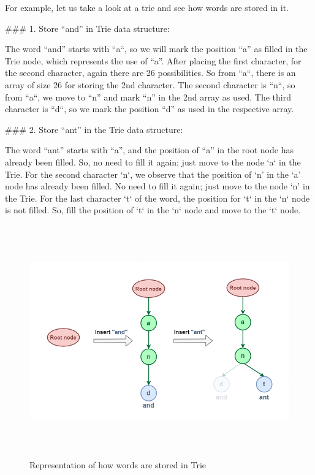 \documentclass[11pt,a4paper]{article}
\begin{document}
For example, let us take a look at a trie and see how words are stored in it.

### 1. Store “and” in Trie data structure:

The word “and” starts with “a“, so we will mark the position “a” as filled in the Trie node, which represents the use of “a”. After placing the first character, for the second character, again there are 26 possibilities. So from “a“, there is an array of size 26 for storing the 2nd character. The second character is “n“, so from “a“, we move to “n” and mark “n” in the 2nd array as used. The third character is “d“, so we mark the position “d” as used in the respective array.


### 2. Store “ant” in the Trie data structure:

The word “ant” starts with “a”, and the position of “a” in the root node has already been filled. So, no need to fill it again; just move to the node ‘a‘ in the Trie.
For the second character ‘n‘, we observe that the position of ‘n’ in the ‘a’ node has already been filled. No need to fill it again; just move to the node ‘n’ in the Trie.
For the last character ‘t‘ of the word, the position for ‘t‘ in the ‘n‘ node is not filled. So, fill the position of ‘t‘ in the ‘n‘ node and move to the ‘t‘ node.

\begin{figure}[H]
    \centering
    \includegraphics[width=14cm, height=10cm]{Triedatastructure1.png}
    \caption{Representation of how words are stored in Trie}
    \label{fig:StoringExample}
\end{figure}
\end{document}
